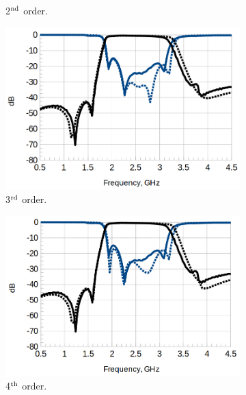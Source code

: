 \documentclass[titlepage]{article}
\renewcommand\_{\textunderscore\linebreak[1]}
\begin{document}
\begin{figure}[p]
\begin{subfigure}{0.45\textwidth}
     \caption{2$^{\textnormal{nd}}$ order.}
  \end{subfigure}
  \par\bigskip
  \begin{subfigure}{0.45\textwidth}
     \includegraphics[width=\linewidth]{../regression/OpenParEM3D/microstrip/filter_study/screenshots/microstrip_filter_3rd_order.png}
     \caption{3$^{\textnormal{rd}}$ order.}
  \end{subfigure}
  \begin{subfigure}{0.45\textwidth}
     \includegraphics[width=\linewidth]{../regression/OpenParEM3D/microstrip/filter_study/screenshots/microstrip_filter_4th_order.png}
     \caption{4$^{\textnormal{th}}$ order.}
  \end{subfigure}
  \par\bigskip
  \begin{subfigure}{0.72\textwidth}

\end{subfigure}
\end{figure}
\end{document}
